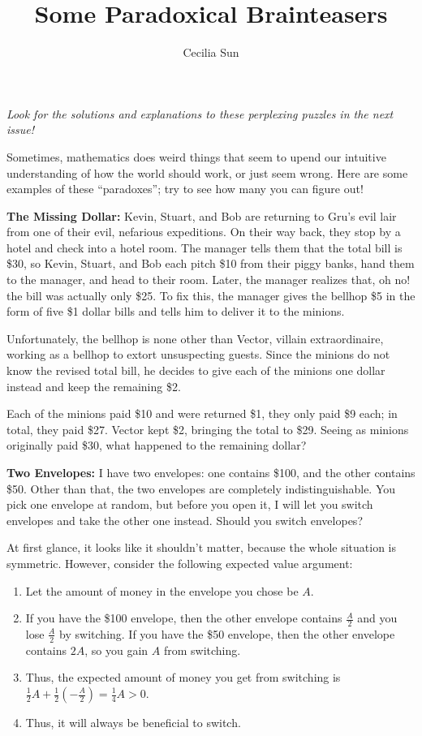 \documentclass{article}
\title{Some Paradoxical Brainteasers}
\author{Cecilia Sun}
\begin{document}
\maketitle
\textit{Look for the solutions and explanations to these perplexing puzzles in the next issue!}

Sometimes, mathematics does weird things that seem to upend our intuitive understanding of how the world should work, or just seem wrong. Here are some examples of these “paradoxes”; try to see how many you can figure out!

\textbf{The Missing Dollar:} 
Kevin, Stuart, and Bob are returning to Gru’s evil lair from one of their evil, nefarious expeditions. On their way back, they stop by a hotel and check into a hotel room. The manager tells them that the total bill is \$30, so Kevin, Stuart, and Bob each pitch \$10 from their piggy banks, hand them to the manager, and head to their room. Later, the manager realizes that, oh no! the bill was actually only \$25. To fix this, the manager gives the bellhop \$5 in the form of five \$1 dollar bills and tells him to deliver it to the minions. 

Unfortunately, the bellhop is none other than Vector, villain extraordinaire, working as a bellhop to extort unsuspecting guests. Since the minions do not know the revised total bill, he decides to give each of the minions one dollar instead and keep the remaining \$2. 

Each of the minions paid \$10 and were returned \$1, they only paid \$9 each; in total, they paid \$27. Vector kept \$2, bringing the total to \$29. Seeing as minions originally paid \$30, what happened to the remaining dollar?

\textbf{Two Envelopes:}
I have two envelopes: one contains \$100, and the other contains \$50. Other than that, the two envelopes are completely indistinguishable. You pick one envelope at random, but before you open it, I will let you switch envelopes and take the other one instead. Should you switch envelopes?

At first glance, it looks like it shouldn’t matter, because the whole situation is symmetric. However, consider the following expected value argument:
\begin{enumerate}
	\item Let the amount of money in the envelope you chose be $A$. 
\item If you have the \$100 envelope, then the other envelope contains $\frac A2$ and you lose $\frac A2$ by switching. If you have the \$50 envelope, then the other envelope contains $2A$, so you gain $A$ from switching.
	\item Thus, the expected amount of money you get from switching is $\frac12A+\frac12(-\frac A2)=\frac14A>0$. 
	\item Thus, it will always be beneficial to switch.
\end{enumerate}
 
\end{document}
